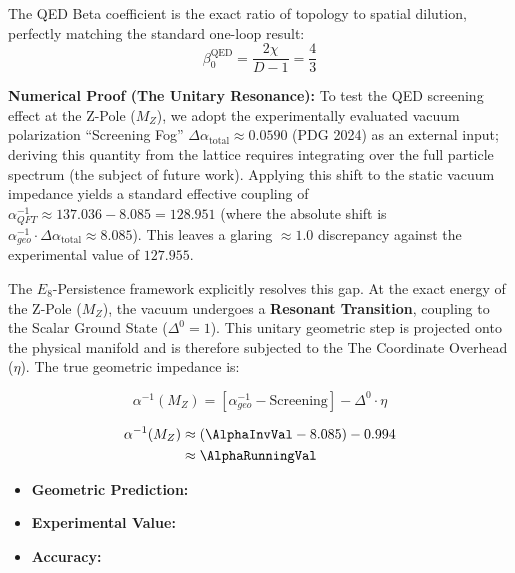 The QED Beta coefficient is the exact ratio of topology to spatial dilution, perfectly matching the standard one-loop result:
\begin{equation}
    \beta_0^{\text{QED}} = \frac{2\chi}{D-1} = \frac{4}{3}
\end{equation}

\textbf{Numerical Proof (The Unitary Resonance):}
To test the QED screening effect at the Z-Pole ($M_Z$), we adopt the experimentally evaluated vacuum polarization ``Screening Fog'' $\Delta \alpha_{\text{total}} \approx 0.0590$ (PDG 2024) as an external input; deriving this quantity from the lattice requires integrating over the full particle spectrum (the subject of future work). Applying this shift to the static vacuum impedance yields a standard effective coupling of $\alpha^{-1}_{QFT} \approx 137.036 - 8.085 = 128.951$ (where the absolute shift is $\alpha^{-1}_{geo} \cdot \Delta \alpha_{\text{total}} \approx 8.085$). This leaves a glaring $\approx 1.0$ discrepancy against the experimental value of $127.955$.

The $E_8$-Persistence framework explicitly resolves this gap. At the exact energy of the Z-Pole ($M_Z$), the vacuum undergoes a \textbf{Resonant Transition}, coupling to the Scalar Ground State ($\Delta^0 = 1$). This unitary geometric step is projected onto the physical manifold and is therefore subjected to the The Coordinate Overhead ($\eta$). The true geometric impedance is:

\begin{equation}
\alpha^{-1}(M_Z) = \left[ \alpha^{-1}_{geo} - \text{Screening} \right] - \Delta^0 \cdot \eta
\end{equation}

\begin{equation}
\begin{split}   
\alpha^{-1}(M_Z) 
& \approx (\AlphaInvVal - 8.085) - 0.994 \\
& \approx \mathbf{\AlphaRunningVal}
\end{split}
\end{equation}

\begin{itemize}
    \item \textbf{Geometric Prediction:} \AlphaRunningVal
    \item \textbf{Experimental Value:} \AlphaRunningExperimentalValue
    \item \textbf{Accuracy:} \AlphaRunningAccText
\end{itemize}

